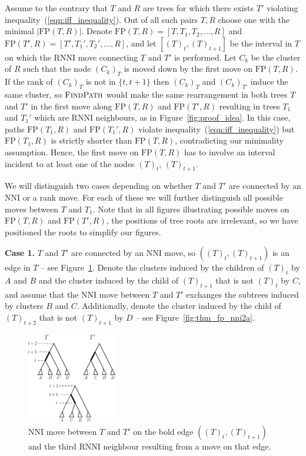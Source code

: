 \documentclass[11pt]{amsart}
\newcommand{\rnni}{\mathrm{RNNI}}
\newcommand{\findpath}{\textsc{FindPath}}
\newcommand{\nni}{\mathrm{NNI}}
\newcommand{\fp}{\mathrm{FP}}
\begin{document}
Assume to the contrary that $T$ and $R$ are trees for which there exists $T'$ violating inequality~(\ref{eqn:iff_inequality}).
Out of all such pairs $T, R$ choose one with the minimal $|\fp(T, R)|$.
Denote $\fp(T,R) = [T, T_1, T_2, \ldots, R]$ and $\fp(T', R) = [T', T_1', T_2', \ldots, R]$, and let $[(T)_t, (T)_{t+1}]$ be the interval in $T$ on which the $\rnni$ move connecting $T$ and $T'$ is performed.
Let $C_k$ be the cluster of $R$ such that the node $(C_k)_T$ is moved down by the first move on $\fp(T, R)$.
If the rank of $(C_k)_T$ is not in $\{t, t+1\}$ then $(C_k)_T$ and $(C_k)_{T'}$ induce the same cluster, so $\findpath$ would make the same rearrangement in both trees $T$ and $T'$ in the first move along $\fp(T, R)$ and $\fp(T', R)$ resulting in trees $T_1$ and $T_1'$ which are $\rnni$ neighbours, as in Figure~\ref{fig:proof_idea}.
In this case, paths $\fp(T_1, R)$ and $\fp(T_1', R)$ violate inequality~(\ref{eqn:iff_inequality}) but $\fp(T_1, R)$ is strictly shorter than $\fp(T, R)$, contradicting our minimality assumption.
Hence, the first move on $\fp(T, R)$ has to involve an interval incident to at least one of the nodes $(T)_t$, $(T)_{t+1}$.

We will distinguish two cases depending on whether $T$ and $T'$ are connected by an $\nni$ or a rank move.
For each of these we will further distinguish all possible moves between $T$ and $T_1$.
Note that in all figures illustrating possible moves on $\fp(T,R)$ and $\fp(T',R)$, the positions of tree roots are irrelevant, so we have positioned the roots to simplify our figures.

\textbf{Case 1.}
$T$ and $T'$ are connected by an $\nni$ move, so $((T)_t,(T)_{t+1})$ is an edge in $T$ -- see Figure~\ref{fig:thm_fp_nni1}.
Denote the clusters induced by the children of $(T)_t$ by $A$ and $B$ and the cluster induced by the child of $(T)_{t+1}$ that is not $(T)_t$ by $C$, and assume that the $\nni$ move between $T$ and $T'$ exchanges the subtrees induced by clusters $B$ and $C$.
Additionally, denote the cluster induced by the child of $(T)_{t+2}$ that is not $(T)_{t+1}$ by $D$ -- see Figure~\ref{fig:thm_fp_nni2a}.

\begin{figure}[!hbt]
\centering
\includegraphics[width=0.35\textwidth]{thm_fp_nni1}
\caption{$\nni$ move between $T$ and $T'$ on the bold edge $((T)_t,(T)_{t+1})$ and the third $\rnni$ neighbour resulting from a move on that edge.}
\label{fig:thm_fp_nni1}
\end{figure}
\end{document}
